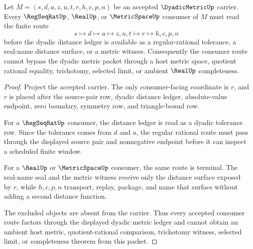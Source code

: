 \begin{theorem}
\label{thm:dyadic-metric-regseqrat-consumer-handoff}
Let $M=(s,d,a,z,u,t,r,h,c,p,n)$ be an accepted $\DyadicMetricUp$ carrier. Every $\RegSeqRatUp$, $\RealUp$, or $\MetricSpaceUp$ consumer of $M$ must read the finite route
$$
s \longmapsto d \longmapsto a \longmapsto z,u,t \longmapsto r \longmapsto h,c,p,n
$$
before the dyadic distance ledger is available as a regular-rational tolerance, a real-name distance surface, or a metric witness. Consequently the consumer route cannot bypass the dyadic metric packet through a host metric space, quotient rational equality, trichotomy, selected limit, or ambient $\RealUp$ completeness.
\end{theorem}
\begin{proof}
Project the accepted carrier. The only consumer-facing coordinate is $r$, and $r$ is placed after the source-pair row, dyadic distance ledger, absolute-value endpoint, zero boundary, symmetry row, and triangle-bound row.

For a $\RegSeqRatUp$ consumer, the distance ledger is read as a dyadic tolerance row. Since the tolerance comes from $d$ and $a$, the regular rational route must pass through the displayed source pair and nonnegative endpoint before it can inspect a scheduled finite window.

For a $\RealUp$ or $\MetricSpaceUp$ consumer, the same route is terminal. The real-name seal and the metric witness receive only the distance surface exposed by $r$, while $h,c,p,n$ transport, replay, package, and name that surface without adding a second distance function.

The excluded objects are absent from the carrier. Thus every accepted consumer route factors through the displayed dyadic metric ledger and cannot obtain an ambient host metric, quotient-rational comparison, trichotomy witness, selected limit, or completeness theorem from this packet.
\end{proof}

